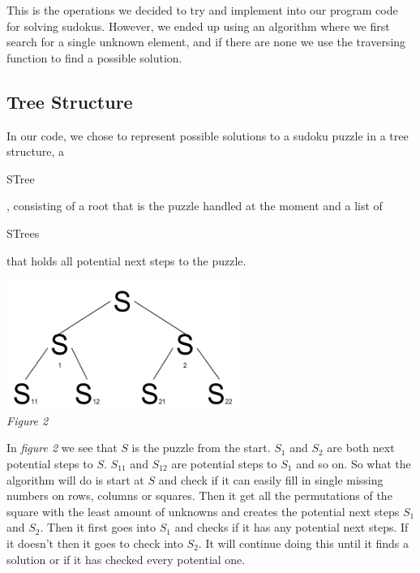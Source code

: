 \documentclass[12pt, a4paper]{article}
\begin{document}
\begin{adjustwidth}{2em}{0pt}
\begin{adjustwidth}{3em}{0pt}
				This is the operations we decided to try and implement into our program code for solving sudokus. However, we ended up using an algorithm where we first search for a single unknown element, and if there are none we use the traversing function to find a possible solution.


	  		\end{adjustwidth}
	  	\subsection{Tree Structure}
			\begin{adjustwidth}{3em}{0pt}
				In our code, we chose to represent possible solutions to a sudoku puzzle in a tree structure, a \begin{ttfamily}STree\end{ttfamily}, consisting of a root that is the puzzle handled at the moment and a list of \begin{ttfamily}STrees\end{ttfamily} that holds all potential next steps to the puzzle.

				\begin{center}
					\includegraphics[width=3in]{tree.png} \\ \textit{Figure 2}
				\end{center}

				In \textit{figure 2} we see that $S$ is the puzzle from the start. $S_1$ and $S_2$ are both next potential steps to $S$. $S_{11}$ and $S_{12}$ are potential steps to $S_1$ and so on. So what the algorithm will do is start at $S$ and check if it can easily fill in single missing numbers on rows, columns or squares. Then it get all the permutations of the square with the least amount of unknowns and creates the potential next steps $S_1$ and $S_2$. Then it first goes into $S_1$ and checks if it has any potential next steps. If it doesn’t then it goes to check into $S_2$. It will continue doing this until it finds a solution or if it has checked every potential one.

			\end{adjustwidth}


\end{adjustwidth}
\end{document}
